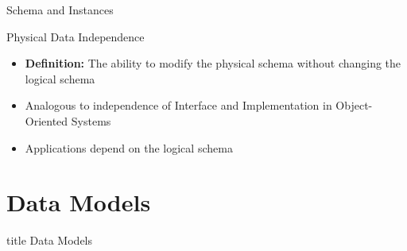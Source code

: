 \documentclass[aspectratio=169, xcolor=dvipsnames]{beamer}
\begin{document}
\begin{frame}{Schema and Instances}
    \begin{block}{Physical Data Independence}
        \begin{itemize}[<+->]
            \item \textbf{Definition:} The ability to modify the physical schema without changing the logical schema
            \item Analogous to independence of Interface and Implementation in Object-Oriented Systems
            \item Applications depend on the logical schema
        \end{itemize}
    \end{block}
    
\end{frame}

\section{Data Models}

\begin{frame}
  \vfill
  \centering
  \begin{beamercolorbox}[sep=8pt,center,shadow=true,rounded=true]{title}
    Data Models\par%
  \end{beamercolorbox}
  \vfill
\end{frame}
\end{document}
